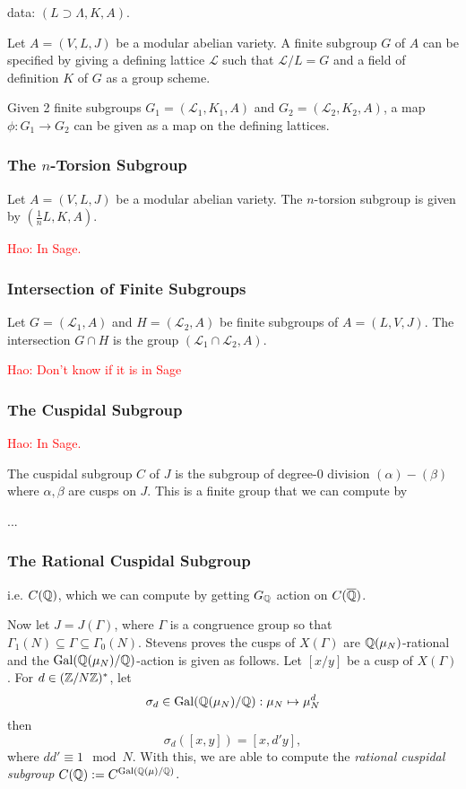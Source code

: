 \documentclass{article}
\newcommand{\Haonew}[1]{\textcolor{red}{\textsf{Hao: #1}}}
\begin{document}
data: $(L\supset \Lambda, K, A)$.

Let $A=(V, L, J)$ be a modular abelian variety. A finite subgroup $G$ of $A$
can be specified by giving a defining lattice $\mathcal{L}$ such that
$\mathcal{L}/L = G$ and a field of definition $K$ of $G$ as a group scheme. 

Given 2 finite subgroups $G_1=(\mathcal{L}_1, K_1, A)$ and $G_2=(\mathcal{L}_2,
K_2, A)$, a map $\phi: G_1\to G_2$ can be given as a map on the defining
lattices.


\subsubsection{The $n$-Torsion Subgroup}

Let $A=(V, L, J)$ be a modular abelian variety. The $n$-torsion subgroup is
given by $(\frac{1}{n} L, K, A)$.

\Haonew{In Sage.}


\subsubsection{Intersection of Finite Subgroups}

Let $G=(\mathcal{L}_1, A)$ and $H=(\mathcal{L}_2, A)$ be finite subgroups of
$A=(L, V, J)$. The intersection $G\cap H$ is the group $(\mathcal{L}_1\cap
\mathcal{L}_2, A)$.

\Haonew{Don't know if it is in Sage}


\subsubsection{The Cuspidal Subgroup}

\Haonew{In Sage.}

The cuspidal subgroup $C$ of $J$ is the subgroup of degree-0 division
$(\alpha)-(\beta)$ where $\alpha,\beta$ are cusps on $J$. This is a finite
group that we can compute by

...


\subsubsection{The Rational Cuspidal Subgroup}
i.e. $C(\mathbb{Q})$,
which we can compute by getting $G_{\mathbb{Q}}$ action on $C(\overline{\mathbb{Q}})$.

Now let $J = J(\Gamma)$, where $\Gamma$ is a congruence group so that
$\Gamma_1(N)\subseteq \Gamma \subseteq \Gamma_0(N)$. Stevens proves the cusps
of $X(\Gamma)$ are $\mathbb{Q}(\mu_N)$-rational and the $\operatorname{Gal}(\mathbb{Q}(\mu_N)/\mathbb{Q})$-action is
given as follows. Let $[x/y]$ be a cusp of $X(\Gamma)$. For $d\in
(\mathbb{Z}/N\mathbb{Z})^*$, let
\[
    \sigma_d\in \operatorname{Gal}(\mathbb{Q}(\mu_N)/\mathbb{Q}):\mu_N\mapsto \mu_N ^d
\]
then
\[
    \sigma_d([x,y])=[x,d'y],
\]
where $dd'\equiv 1 \mod{N}$. With this, we are able to compute the
\emph{rational cuspidal subgroup} $C(\mathbb{Q}):=C^{\operatorname{Gal}(\mathbb{Q}(\mu)/\mathbb{Q})}$.
\end{document}
